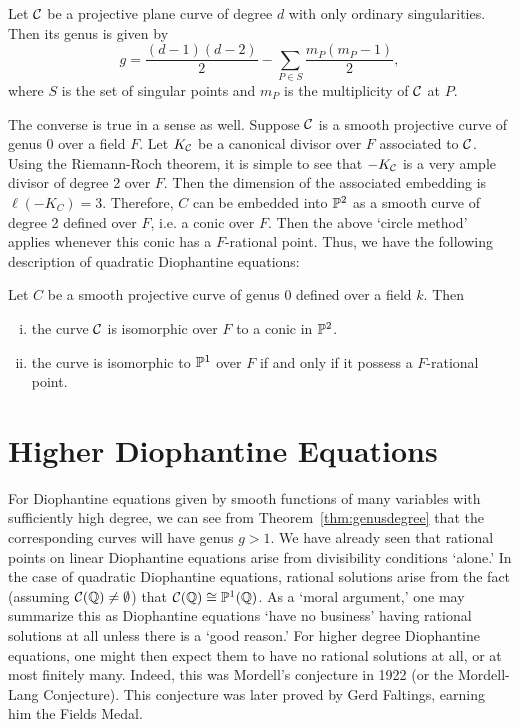 \begin{thm} \label{thm:genusdegree}
Let $\cC$ be a projective plane curve of degree $d$ with only ordinary singularities. Then its genus is given by
	\[
	g= \dfrac{(d - 1)(d - 2)}{2} - \sum_{P \in S} \dfrac{m_P(m_P - 1)}{2},
	\]
where $S$ is the set of singular points and $m_P$ is the multiplicity of $\cC$ at $P$.
\end{thm}

	
The converse is true in a sense as well. Suppose $\cC$ is a smooth projective curve of genus 0 over a field $F$. Let $K_\cC$ be a canonical divisor over $F$ associated to $\cC$. Using the Riemann-Roch theorem, it is simple to see that $-K_\cC$ is a very ample divisor of degree 2 over $F$. Then the dimension of the associated embedding is $\ell(-K_C)= 3$. Therefore, $C$ can be embedded into $\P^2$ as a smooth curve of degree 2 defined over $F$, i.e. a conic over $F$. Then the above `circle method' applies whenever this conic has a $F$-rational point. Thus, we have the following description of quadratic Diophantine equations:


\begin{thm} \label{thm:genus0case}
Let $C$ be a smooth projective curve of genus 0 defined over a field $k$. Then
\leavevmode\vspace{-2em}
	\begin{enumerate}[(i)]
	\item the curve $\cC$ is isomorphic over $F$ to a conic in $\P^2$.\leavevmode\vspace{-2em}
	\item the curve is isomorphic to $\P^1$ over $F$ if and only if it possess a $F$-rational point.
	\end{enumerate}
\end{thm}





\section{Higher Diophantine Equations\label{sec:highdioeq}}

For Diophantine equations given by smooth functions of many variables with sufficiently high degree, we can see from Theorem~\ref{thm:genusdegree} that the corresponding curves will have genus $g > 1$. We have already seen that rational points on linear Diophantine equations arise from divisibility conditions `alone.' In the case of quadratic Diophantine equations, rational solutions arise from the fact (assuming $\cC(\Q) \neq \emptyset$) that $\cC(\Q) \cong \P^1(\Q)$. As a `moral argument,' one may summarize this as Diophantine equations `have no business' having rational solutions at all unless there is a `good reason.' For higher degree Diophantine equations, one might then expect them to have no rational solutions at all, or at most finitely many. Indeed, this was Mordell's conjecture in 1922 (or the Mordell-Lang Conjecture). This conjecture was later proved by Gerd Faltings, earning him the Fields Medal.


